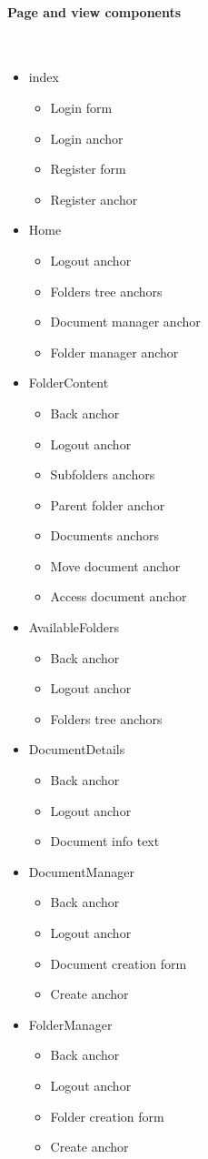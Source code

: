 \documentclass[a4paper,12pt]{article}
\newcommand{\myparagraph}[1]{\paragraph{#1}\mbox{}\\}
\begin{document}
\myparagraph{Page and view components}
\begin{multicols}{2}
\begin{itemize}
	\item{index}
	\begin{itemize}
		\item{Login form}
		\item{Login anchor}
		\item{Register form}
		\item{Register anchor}
	\end{itemize}
	\item{Home}
	\begin{itemize}
		\item{Logout anchor}
		\item{Folders tree anchors}
		\item{Document manager anchor}
		\item{Folder manager anchor}
	\end{itemize}
	\item{FolderContent}
	\begin{itemize}
		\item{Back anchor}
		\item{Logout anchor}
		\item{Subfolders anchors}
		\item{Parent folder anchor}
		\item{Documents anchors}
		\item{Move document anchor}
		\item{Access document anchor}
	\end{itemize}
	\item{AvailableFolders}
	\begin{itemize}
		\item{Back anchor}
		\item{Logout anchor}
		\item{Folders tree anchors}
	\end{itemize}
	\item{DocumentDetails}
	\begin{itemize}
		\item{Back anchor}
		\item{Logout anchor}
		\item{Document info text}
	\end{itemize}
	\item{DocumentManager}
	\begin{itemize}
		\item{Back anchor}
		\item{Logout anchor}
		\item{Document creation form}
		\item{Create anchor}
	\end{itemize}
	\item{FolderManager}
	\begin{itemize}
		\item{Back anchor}
		\item{Logout anchor}
		\item{Folder creation form}
		\item{Create anchor}
	\end{itemize}
							

\end{itemize}
\end{multicols}
\end{document}
